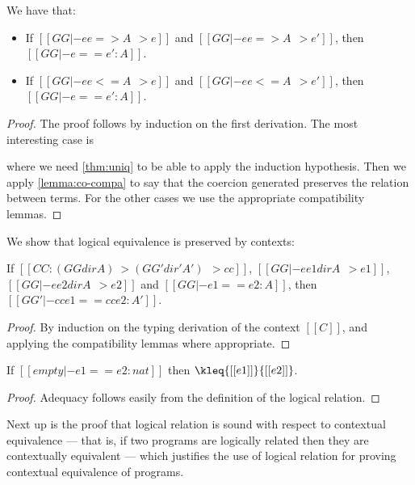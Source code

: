 \begin{theorem}  \label{thm:co-log} We have that:
  \begin{itemize}
  \item If $[[GG |- ee => A ~~> e]]$ and $[[GG |- ee => A ~~> e']]$, then $[[GG |- e == e' : A ]]$.
  \item If $[[GG |- ee <= A ~~> e]]$ and $[[GG |- ee <= A ~~> e']]$, then $[[GG |- e == e' : A ]]$.
  \end{itemize}
\end{theorem}
\begin{proof}
  The proof follows by induction on the first derivation. The most interesting
  case is 
  \begin{mathpar}
  \end{mathpar}
  where we need \cref{thm:uniq} to be able to apply the induction hypothesis.
  Then we apply \cref{lemma:co-compa} to say that the coercion generated
  preserves the relation between terms. For the other cases we use the
  appropriate compatibility lemmas.
\end{proof}


We show that logical equivalence is preserved by \namee contexts:

\begin{lemma}[Congruence] \label{lemma:cong}
 If $[[CC : (GG dir A) ~> (GG' dir' A') ~~> cc]]$, $[[GG |- ee1 dir A ~~> e1]]$, $[[GG |- ee2 dir A ~~> e2]]$
 and $[[GG |- e1 == e2 : A]]$, then $[[GG' |- cc{e1} == cc{e2} : A']]$.
\end{lemma}
\begin{proof}
  By induction on the typing derivation of the context $[[C]]$, and applying
  the compatibility lemmas where appropriate.
\end{proof}


\begin{lemma}[Adequacy] \label{lemma:ade}
  If $[[  empty |- e1 == e2 : nat ]]$ then $\kleq{[[e1]]}{[[e2]]}$.
\end{lemma}
\begin{proof}
  Adequacy follows easily from the definition of the logical relation.
\end{proof}


Next up is the proof that logical relation is sound with respect to contextual
equivalence --- that is, if two programs are logically related then they are
contextually equivalent --- which justifies the use of logical relation for
proving contextual equivalence of programs.

